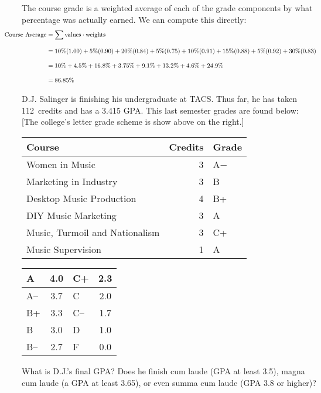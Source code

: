 \documentclass[11pt,letterpaper]{article}
\begin{document}
\sol The course grade is a weighted average of each of the grade components by what percentage was actually earned. We can compute this directly: 
	\[
	\begin{aligned}
	\hspace{-1cm}\text{Course Average}&= \sum \text{values} \cdot \text{weights} \\[0.3cm]
	&= 10\% (1.00) + 5\% (0.90) + 20\% (0.84) + 5\% (0.75) + 10\% (0.91) + 15\% (0.88) + 5\% (0.92) + 30\% (0.83) \\[0.3cm]
	&= 10\% + 4.5\% + 16.8\% + 3.75\% + 9.1\% + 13.2\% + 4.6\% + 24.9\% \\[0.3cm]
	&= 86.85\% 
	\end{aligned}
	\]



\newpage



 D.J. Salinger is finishing his undergraduate at TACS. Thus far, he has taken 112~credits and has a 3.415 GPA. This last semester grades are found below: [The college's letter grade scheme is show above on the right.] \par
	\begin{table}[!ht]
	\centering
	\begin{tabular}{lrl}
	Course & Credits & Grade \\ \hline
	Women in Music & 3 & A$-$ \\
	Marketing in Industry & 3 & B \\
	Desktop Music Production & 4 & B+ \\
	DIY Music Marketing & 3 & A \\
	Music, Turmoil and Nationalism & 3 & C+ \\
	Music Supervision & 1 & A
	\end{tabular} \hspace{1cm}
        \begin{tabular}{|l||c|l||c|} \hline
        A & 4.0 & C+ & 2.3 \\ \hline
        A-- & 3.7 & C & 2.0 \\ \hline
        B+ & 3.3 & C-- & 1.7 \\ \hline
        B & 3.0 & D & 1.0 \\ \hline
        B-- & 2.7 & F & 0.0 \\ \hline
        \end{tabular}
	\end{table} \par
What is D.J.'s final GPA? Does he finish cum laude (GPA at least 3.5), magna cum laude (a GPA at least 3.65), or even summa cum laude (GPA 3.8 or higher)? \pspace
\end{document}
